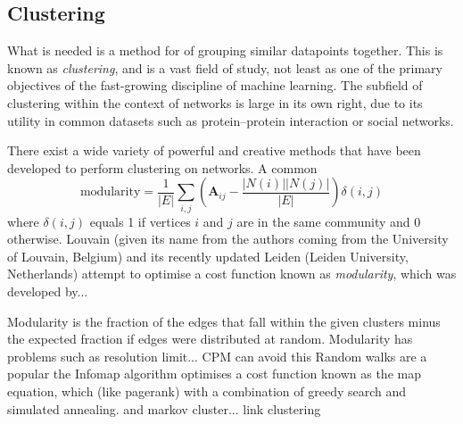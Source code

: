 \subsection{Clustering}
What is needed is a method for of grouping similar datapoints together. This is known as \textit{clustering}, and is a vast field of study, not least as one of the primary objectives of the fast-growing discipline of machine learning. The subfield of clustering within the context of networks is large in its own right, due to its utility in common datasets such as protein--protein interaction or social networks.

There exist a wide variety of powerful and creative methods that have been developed to perform clustering on networks. A common 
\begin{equation}
\mathrm{modularity} = \frac{1}{|E|}\sum_{i,j}\left(\mathbf{A}_{ij} - \frac{|N(i)||N(j)|}{|E|}\right)\delta(i,j)
\label{eq:modularity}
\end{equation}
where $\delta(i,j)$ equals 1 if vertices $i$ and $j$ are in the same community and 0 otherwise.
Louvain (given its name from the authors coming from the University of Louvain, Belgium) and its recently updated Leiden (Leiden University, Netherlands) attempt to optimise a cost function known as \textit{modularity}, which was developed by...

Modularity is the fraction of the edges that fall within the given clusters minus the expected fraction if edges were distributed at random.
Modularity has problems such as resolution limit... CPM can avoid this
Random walks are a popular the Infomap algorithm optimises a cost function known as the map equation, which (like pagerank) with a combination of greedy search and simulated annealing.
and markov cluster...
link clustering

